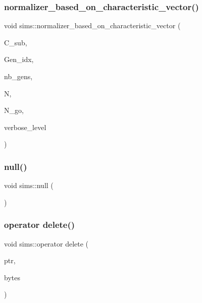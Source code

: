 \subsubsection{\texorpdfstring{normalizer\+\_\+based\+\_\+on\+\_\+characteristic\+\_\+vector()}{normalizer\_based\_on\_characteristic\_vector()}}
{\footnotesize\ttfamily void sims\+::normalizer\+\_\+based\+\_\+on\+\_\+characteristic\+\_\+vector (\begin{DoxyParamCaption}\item[{\mbox{\hyperlink{galois_8h_a09fddde158a3a20bd2dcadb609de11dc}{I\+NT}} $\ast$}]{C\+\_\+sub,  }\item[{\mbox{\hyperlink{galois_8h_a09fddde158a3a20bd2dcadb609de11dc}{I\+NT}} $\ast$}]{Gen\+\_\+idx,  }\item[{\mbox{\hyperlink{galois_8h_a09fddde158a3a20bd2dcadb609de11dc}{I\+NT}}}]{nb\+\_\+gens,  }\item[{\mbox{\hyperlink{galois_8h_a09fddde158a3a20bd2dcadb609de11dc}{I\+NT}} $\ast$}]{N,  }\item[{\mbox{\hyperlink{galois_8h_a09fddde158a3a20bd2dcadb609de11dc}{I\+NT}} \&}]{N\+\_\+go,  }\item[{\mbox{\hyperlink{galois_8h_a09fddde158a3a20bd2dcadb609de11dc}{I\+NT}}}]{verbose\+\_\+level }\end{DoxyParamCaption})}

\mbox{\label{classsims_a47d4aacfa330b9a59d87fb6bf7529e08}} 
\subsubsection{\texorpdfstring{null()}{null()}}
{\footnotesize\ttfamily void sims\+::null (\begin{DoxyParamCaption}{ }\end{DoxyParamCaption})}

\mbox{\label{classsims_ad613390ec8ecb625454785ccc222d1d2}} 
\subsubsection{\texorpdfstring{operator delete()}{operator delete()}}
{\footnotesize\ttfamily void sims\+::operator delete (\begin{DoxyParamCaption}\item[{void $\ast$}]{ptr,  }\item[{size\+\_\+t}]{bytes }\end{DoxyParamCaption})}


